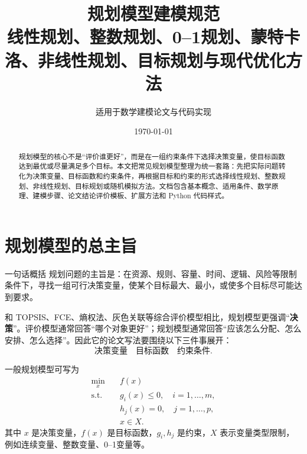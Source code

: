 \documentclass[11pt,a4paper]{ctexart}
\title{\bfseries 规划模型建模规范\\[4pt]\large 线性规划、整数规划、0--1规划、蒙特卡洛、非线性规划、目标规划与现代优化方法}
\author{适用于数学建模论文与代码实现}
\date{\today}
\begin{document}
\maketitle

\begin{abstract}
规划模型的核心不是“评价谁更好”，而是在一组约束条件下选择决策变量，使目标函数达到最优或尽量满足多个目标。本文把常见规划模型整理为统一套路：先把实际问题转化为决策变量、目标函数和约束条件，再根据目标和约束的形式选择线性规划、整数规划、非线性规划、目标规划或随机模拟方法。文档包含基本概念、适用条件、数学原理、建模步骤、论文结论评价模板、扩展方法和 Python 代码样式。
\end{abstract}

\tableofcontents
\newpage

\section{规划模型的总主旨}

\begin{paperbox}{一句话概括}
规划问题的主旨是：在资源、规则、容量、时间、逻辑、风险等限制条件下，寻找一组可行决策变量，使某个目标最大、最小，或使多个目标尽可能达到要求。
\end{paperbox}

和 TOPSIS、FCE、熵权法、灰色关联等综合评价模型相比，规划模型更强调“\textbf{决策}”。评价模型通常回答“哪个对象更好”；规划模型通常回答“应该怎么分配、怎么安排、怎么选择”。因此它的论文写法要围绕以下三件事展开：
\[
\boxed{\text{决策变量}}\quad \boxed{\text{目标函数}}\quad \boxed{\text{约束条件}}.
\]

一般规划模型可写为
\begin{equation}
\begin{aligned}
\min_{x}\quad & f(x)\\
\text{s.t.}\quad & g_i(x)\le 0,\quad i=1,\ldots,m,\\
& h_j(x)=0,\quad j=1,\ldots,p,\\
& x\in X.
\end{aligned}
\end{equation}
其中 $x$ 是决策变量，$f(x)$ 是目标函数，$g_i,h_j$ 是约束，$X$ 表示变量类型限制，例如连续变量、整数变量、0--1变量等。
\end{document}
